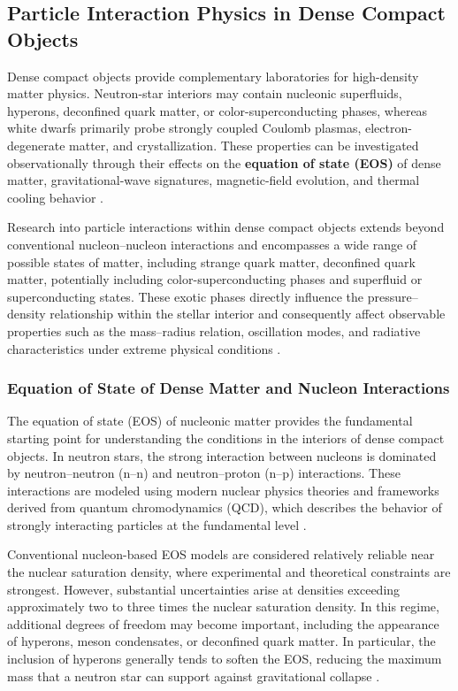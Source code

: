 \subsection{Particle Interaction Physics in Dense Compact Objects}\label{particle-interaction-physics-in-dense-compact-objects}

Dense compact objects provide complementary laboratories for high-density matter physics. Neutron-star interiors may contain nucleonic superfluids, hyperons, deconfined quark matter, or color-superconducting phases, whereas white dwarfs primarily probe strongly coupled Coulomb plasmas, electron-degenerate matter, and crystallization.
These properties can be investigated observationally through their effects on the \textbf{equation of state (EOS)} of dense matter, gravitational-wave signatures, magnetic-field evolution, and thermal cooling behavior \cite{lattimer2007,ozel2016}.

Research into particle interactions within dense compact objects extends beyond conventional nucleon--nucleon interactions and encompasses a wide range of possible states of matter, including strange quark matter, deconfined quark matter, potentially including color-superconducting phases and superfluid or superconducting states. These exotic phases directly influence the pressure--density relationship within the stellar interior and consequently affect observable properties such as the mass--radius relation, oscillation modes, and radiative characteristics under extreme physical conditions \cite{baym2018,raaijmakers2020,raaijmakers2021}.

\subsubsection{Equation of State of Dense Matter and Nucleon Interactions}

The equation of state (EOS) of nucleonic matter provides the fundamental starting point for understanding the conditions in the interiors of dense compact objects. In neutron stars, the strong interaction between nucleons is dominated by neutron--neutron (n--n) and neutron--proton (n--p) interactions. These interactions are modeled using modern nuclear physics theories and frameworks derived from quantum chromodynamics (QCD), which describes the behavior of strongly interacting particles at the fundamental level \cite{akmal1998,gandolfi2012}.

Conventional nucleon-based EOS models are considered relatively reliable near the nuclear saturation density, where experimental and theoretical constraints are strongest. However, substantial uncertainties arise at densities exceeding approximately two to three times the nuclear saturation density. In this regime, additional degrees of freedom may become important, including the appearance of hyperons, meson condensates, or deconfined quark matter. In particular, the inclusion of hyperons generally tends to soften the EOS, reducing the maximum mass that a neutron star can support against gravitational collapse \cite{schaffner2008}.

